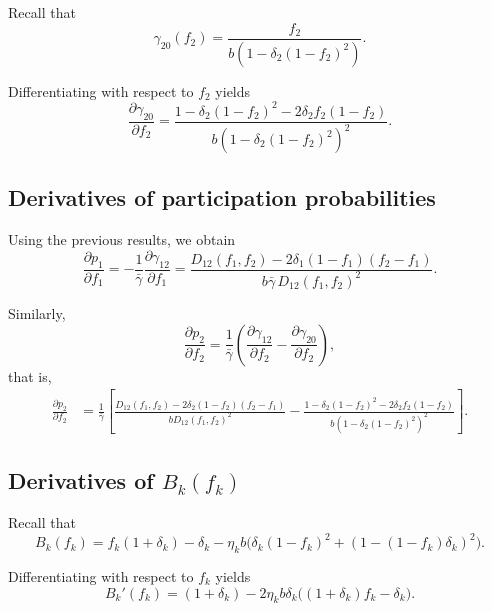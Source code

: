 \documentclass[10pt]{article}
\begin{document}
Recall that
\begin{equation}
\gamma_{20}(f_2)
=
\frac{f_2}{b\left(1-\delta_2(1-f_2)^2\right)}.
\end{equation}

Differentiating with respect to $f_2$ yields
\begin{equation}
\frac{\partial \gamma_{20}}{\partial f_2}
=
\frac{
1-\delta_2(1-f_2)^2
-
2\delta_2 f_2(1-f_2)
}{
b\left(1-\delta_2(1-f_2)^2\right)^2
}.
\end{equation}

\subsection{Derivatives of participation probabilities}

Using the previous results, we obtain
\begin{equation}
\frac{\partial p_1}{\partial f_1}
=
-\frac{1}{\bar{\gamma}}
\frac{\partial \gamma_{12}}{\partial f_1}
=
\frac{
D_{12}(f_1,f_2)
-
2\delta_1(1-f_1)(f_2-f_1)
}{
b\bar{\gamma}\,D_{12}(f_1,f_2)^2
}.
\end{equation}

Similarly,
\begin{equation}
\frac{\partial p_2}{\partial f_2}
=
\frac{1}{\bar{\gamma}}
\left(
\frac{\partial \gamma_{12}}{\partial f_2}
-
\frac{\partial \gamma_{20}}{\partial f_2}
\right),
\end{equation}
that is,
\begin{align}
\frac{\partial p_2}{\partial f_2}
&=
\frac{1}{\bar{\gamma}}
\left[
\frac{
D_{12}(f_1,f_2)
-
2\delta_2(1-f_2)(f_2-f_1)
}{
bD_{12}(f_1,f_2)^2
}
-
\frac{
1-\delta_2(1-f_2)^2
-
2\delta_2 f_2(1-f_2)
}{
b\left(1-\delta_2(1-f_2)^2\right)^2
}
\right].
\end{align}

\subsection{Derivatives of $B_k(f_k)$}

Recall that
\begin{equation}
B_k(f_k)
=
f_k(1+\delta_k)-\delta_k
-\eta_k b
\Big(
\delta_k(1-f_k)^2+(1-(1-f_k)\delta_k)^2
\Big).
\end{equation}

Differentiating with respect to $f_k$ yields
\begin{equation}
B_k'(f_k)
=
(1+\delta_k)
-
2\eta_k b\delta_k
\Big((1+\delta_k)f_k-\delta_k\Big).
\end{equation}
\end{document}
